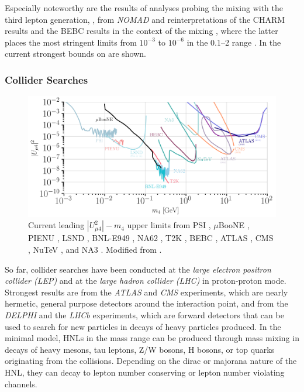 Especially noteworthy are the results of analyses probing the mixing with the third lepton generation, , from \textit{NOMAD}  and reinterpretations of the CHARM results and the BEBC results in the context of the mixing , where the latter places the most stringent limits from $10^{-3}$ to $10^{-6}$ in the \SIrange{0.1}{2}{\gev} range . In  the current strongest bounds on  are shown.


\subsubsection{Collider Searches}

\begin{figure}[t]
    \includegraphics{figures/hnl_simulation/theory/UmuN_majorana.png}
      \caption[Current leading $|U_{\mu4}^2|-m_4$ upper limits]{Current leading $|U_{\mu4}^2|-m_4$ upper limits from PSI \cite{PSI_Daum:1987bg}, $\mu$BooNE \cite{MicroBooNE:2023eef}, PIENU \cite{pienu_Bryman:2019bjg}, LSND \cite{lsnd_Ema:2023buz}, BNL-E949 \cite{BNL_E949:2014gsn}, NA62 \cite{NA62:2022pyf}, T2K \cite{T2K:2019jwa}, BEBC \cite{BEBC_OG_COOPERSARKAR1985207},
      ATLAS \cite{ATLAS:2019kpx, atlas_2022_HNL_PhysRevLett.131.061803}, CMS \cite{CMS:2018iaf, CMS:2022fut}, NuTeV \cite{NuTeV:1999kej}, and NA3 \cite{NA3:1986ahv}. Modified from \cite{hoster_limitFernandez-Martinez:2023phj}.}
\end{figure}


So far, collider searches have been conducted at the \textit{large electron positron collider (LEP)} and at the \textit{large hadron collider (LHC)} in proton-proton mode. Strongest results are from the \textit{ATLAS} and \textit{CMS} experiments, which are nearly hermetic, general purpose detectors around the interaction point, and from the \textit{DELPHI} and the \textit{LHCb} experiments, which are forward detectors that can be used to search for new particles in decays of heavy particles produced. In the minimal model, HNLs in the \si{\gev} mass range can be produced through mass mixing in decays of heavy mesons, tau leptons, Z/W bosons, H bosons, or top quarks originating from the collisions. Depending on the dirac or majorana nature of the HNL, they can decay to lepton number conserving or lepton number violating channels.

